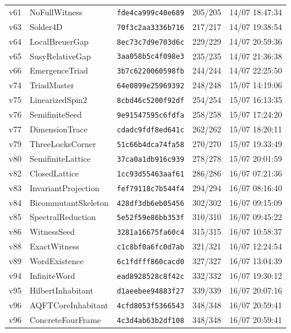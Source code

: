 \documentclass[11pt]{article}
\theoremstyle{definition}\newtheorem{deriv}{Derivation}
\begin{document}
{\begin{longtable}{@{}lllll@{}}
v61 & NoFullWitness & \texttt{fde4ca999c40e689} & 205/205 & 14/07 18:47:34 \\
v63 & Solder4D & \texttt{70f3c2aa3336b716} & 217/217 & 14/07 19:38:54 \\
v64 & LocalBreuerGap & \texttt{8ec73c7d9e703d6c} & 229/229 & 14/07 20:59:36 \\
v65 & SusyRelativeGap & \texttt{3aa058b5c4f098e3} & 235/235 & 14/07 21:36:38 \\
v66 & EmergenceTriad & \texttt{3b7c6220060598fb} & 244/244 & 14/07 22:25:50 \\
v74 & TriadMaster & \texttt{64e0899e25969392} & 248/248 & 15/07 14:19:06 \\
v75 & LinearizedSpin2 & \texttt{8cbd46c5200f92df} & 254/254 & 15/07 16:13:35 \\
v76 & SemifiniteSeed & \texttt{9e91547595c6fdfa} & 258/258 & 15/07 17:24:20 \\
v77 & DimensionTrace & \texttt{cdadc9fdf8ed641c} & 262/262 & 15/07 18:20:11 \\
v79 & ThreeLocksCorner & \texttt{51c66b4dca74fa58} & 270/270 & 15/07 19:33:49 \\
v80 & SemifiniteLattice & \texttt{37ca0a1db916c939} & 278/278 & 15/07 20:01:59 \\
v82 & ClosedLattice & \texttt{1cc93d55463aaf61} & 286/286 & 16/07 07:21:36 \\
v83 & InvariantProjection & \texttt{fef79118c7b544f4} & 294/294 & 16/07 08:16:40 \\
v84 & BicommutantSkeleton & \texttt{428df3db6eb05456} & 302/302 & 16/07 09:15:09 \\
v85 & SpectralReduction & \texttt{5e52f59e86bb353f} & 310/310 & 16/07 09:45:22 \\
v86 & WitnessSeed & \texttt{3281a16675fa60c4} & 315/315 & 16/07 10:58:37 \\
v88 & ExactWitness & \texttt{c1c8bf0a6fc0d7ab} & 321/321 & 16/07 12:24:54 \\
v89 & WordExistence & \texttt{6c1fdfff860cacd0} & 327/327 & 16/07 13:04:39 \\
v94 & InfiniteWord & \texttt{ead8928528c8f42c} & 332/332 & 16/07 19:30:12 \\
v95 & HilbertInhabitant & \texttt{d1aeebee94883f27} & 339/339 & 16/07 20:07:16 \\
v96 & AQFTCoreInhabitant & \texttt{4cfd8053f5366543} & 348/348 & 16/07 20:59:41 \\
v96 & ConcreteFourFrame & \texttt{4c3d4ab63b2df108} & 348/348 & 16/07 20:59:41 \\

\end{longtable}}
\end{document}
